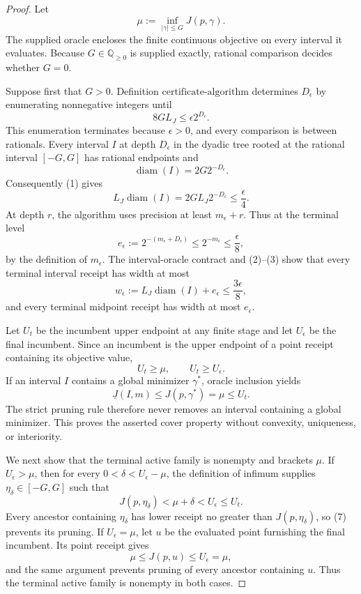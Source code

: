 \documentclass{article}
\begin{document}
\begin{proof}
Let
\[
 \mu:=\inf_{|\gamma|\leq G}J(p,\gamma).
\]
The supplied oracle encloses the finite continuous objective on every interval it evaluates.  Because \(G\in\mathbb Q_{\geq0}\) is supplied exactly, rational comparison decides whether \(G=0\).

Suppose first that \(G>0\).  Definition \(\mathrm{certificate\mbox{-}algorithm}\) determines \(D_\epsilon\) by enumerating nonnegative integers until
\[
 8GL_J\leq\epsilon2^{D_\epsilon}.
\tag{1}
\]
This enumeration terminates because \(\epsilon>0\), and every comparison is between rationals.  Every interval \(I\) at depth \(D_\epsilon\) in the dyadic tree rooted at the rational interval \([-G,G]\) has rational endpoints and
\[
 \operatorname{diam}(I)=2G2^{-D_\epsilon}.
\]
Consequently (1) gives
\[
 L_J\operatorname{diam}(I)
 =2GL_J2^{-D_\epsilon}\leq\frac\epsilon4.
\tag{2}
\]
At depth \(r\), the algorithm uses precision at least \(m_\epsilon+r\).  Thus at the terminal level
\[
 e_\epsilon:=2^{-(m_\epsilon+D_\epsilon)}
 \leq2^{-m_\epsilon}\leq\frac\epsilon8,
\tag{3}
\]
by the definition of \(m_\epsilon\).  The interval-oracle contract and (2)--(3) show that every terminal interval receipt has width at most
\[
 w_\epsilon:=L_J\operatorname{diam}(I)+e_\epsilon
 \leq\frac{3\epsilon}{8},
\tag{4}
\]
and every terminal midpoint receipt has width at most \(e_\epsilon\).

Let \(U_t\) be the incumbent upper endpoint at any finite stage and let \(U_\epsilon\) be the final incumbent.  Since an incumbent is the upper endpoint of a point receipt containing its objective value,
\[
 U_t\geq\mu,
 \qquad U_t\geq U_\epsilon.
\tag{5}
\]
If an interval \(I\) contains a global minimizer \(\gamma^*\), oracle inclusion yields
\[
 \underline J(I,m)\leq J(p,\gamma^*)=\mu\leq U_t.
\tag{6}
\]
The strict pruning rule therefore never removes an interval containing a global minimizer.  This proves the asserted cover property without convexity, uniqueness, or interiority.

We next show that the terminal active family is nonempty and brackets \(\mu\).  If \(U_\epsilon>\mu\), then for every \(0<\delta<U_\epsilon-\mu\), the definition of infimum supplies \(\eta_\delta\in[-G,G]\) such that
\[
 J(p,\eta_\delta)<\mu+\delta<U_\epsilon\leq U_t.
\tag{7}
\]
Every ancestor containing \(\eta_\delta\) has lower receipt no greater than \(J(p,\eta_\delta)\), so (7) prevents its pruning.  If \(U_\epsilon=\mu\), let \(u\) be the evaluated point furnishing the final incumbent.  Its point receipt gives
\[
 \mu\leq J(p,u)\leq U_\epsilon=\mu,
\tag{8}
\]
and the same argument prevents pruning of every ancestor containing \(u\).  Thus the terminal active family is nonempty in both cases.


\end{proof}
\end{document}
